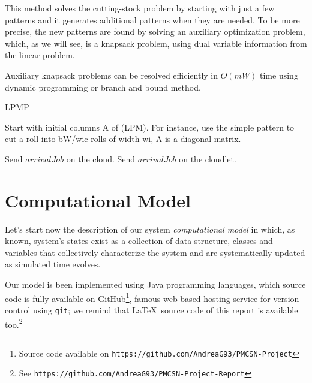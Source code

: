 \documentclass[10pt,a4paper]{article}
\begin{document}
This method solves the cutting-stock problem by starting with just a few patterns and it generates additional patterns when they are needed. To be more precise, the new patterns are found by solving an auxiliary optimization problem, which, as we will see, is a knapsack problem, using dual variable information from the linear problem. 

Auxiliary knapsack problems can be resolved efficiently in $O(mW)$ time using dynamic programming or branch and bound method.



\begin{algorithm}

\caption{}\label{alg:accessControlAlgorithm1}

\begin{algorithmic}


LPMP

Start with initial columns A of (LPM). For instance, use the simple pattern to cut a roll into bW/wic rolls of width wi, A is a diagonal matrix.



	\State Send $\textit{arrivalJob}$ on the cloud.
\Else 	
 	\State Send $\textit{arrivalJob}$ on the cloudlet.
\EndIf

\EndFunction

\end{algorithmic}

\end{algorithm}

\section{Computational Model}

Let's start now the description of our system \textit{computational model} in which, as known, system's states exist as a collection of data structure, classes and variables that collectively characterize the system and are systematically updated as simulated time evolves.

Our model is been implemented using Java programming languages, which source code is fully available on GitHub\footnote{Source code available on \texttt{https://github.com/AndreaG93/PMCSN-Project}}, famous web-based hosting service for version control using \texttt{git}; we remind that \LaTeX\ source code of this report is available too.\footnote{See \texttt{https://github.com/AndreaG93/PMCSN-Project-Report}}
\end{document}
